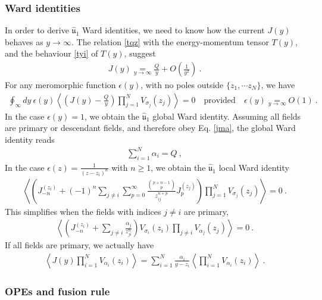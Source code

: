 \documentclass[12pt, a4paper, notitlepage, twoside]{report}
\numberwithin{equation}{section}
\theoremstyle{break}
\begin{document}
\subsubsection{Ward identities}

In order to derive $\hat{\mathfrak{u}}_1$ Ward identities, we need to know how the current $J(y)$ behaves as $y\to \infty$.
The relation \eqref{tqz} with the energy-momentum tensor $T(y)$, and the behaviour \eqref{tyi} of $T(y)$, suggest
\begin{align}
 \boxed{J(y) \underset{y\to \infty}{=} \frac{Q}{y} + O\left(\frac{1}{y^2}\right)}\ .
\label{jyi}
\end{align}
For any meromorphic function $\epsilon(y)$, with no poles outside $\{z_1,\cdots z_N\}$, we have 
\begin{align}
 \oint_\infty dy\ \epsilon(y) \left\langle \left(J(y)-\frac{Q}{y}\right)\prod_{j=1}^N V_{\sigma_j}(z_j)\right\rangle = 0   \quad \text{provided} \quad \epsilon(y) \underset{y\to\infty}{=} O(1)\ .
\end{align}
In the case $\epsilon(y)=1$, we obtain the $\hat{\mathfrak{u}}_1$ global Ward identity.
Assuming all fields are primary or descendant fields, and therefore obey Eq. \eqref{jma}, the global Ward identity reads
\begin{align}
 \boxed{\sum_{i=1}^N \alpha_i = Q} \ ,
\label{saq}
\end{align}
In the case $\epsilon(z) = \frac{1}{(z-z_i)^{n}}$ with $n\geq 1$, we obtain the $\hat{\mathfrak{u}}_1$ local Ward identity
\begin{align}
\left\langle \left(J_{-n}^{(z_i)}+ (-1)^{n}\sum_{j\neq i}\sum_{p=0}^\infty \frac{\binom{p+n-1}{p}}{z_{ij}^{n+p}}  J_p^{(z_j)}\right)\prod_{j=1}^N V_{\sigma_j}(z_j) \right\rangle = 0\ .
\label{jnjp}
\end{align}
This simplifies when the fields with indices $j\neq i$ are primary, 
\begin{align}
 \left\langle \left(J_{-n}^{(z_i)}  + \sum_{j\neq i} \frac{\alpha_j}{z_{ji}^n}\right) V_{\sigma_i}(z_i)\prod_{j\neq i} V_{\alpha_j}(z_j)\right\rangle= 0\ .
\label{jnz}
\end{align}
If all fields are primary, we actually have 
\begin{align}
 \boxed{\left\langle J(y) \prod_{i=1}^N V_{\alpha_i}(z_i) \right\rangle = \sum_{i=1}^N \frac{\alpha_i}{y-z_i} \left\langle \prod_{i=1}^N V_{\alpha_i}(z_i) \right\rangle  }\ .
\label{jsa}
\end{align}

\subsubsection{OPEs and fusion rule}
\end{document}
